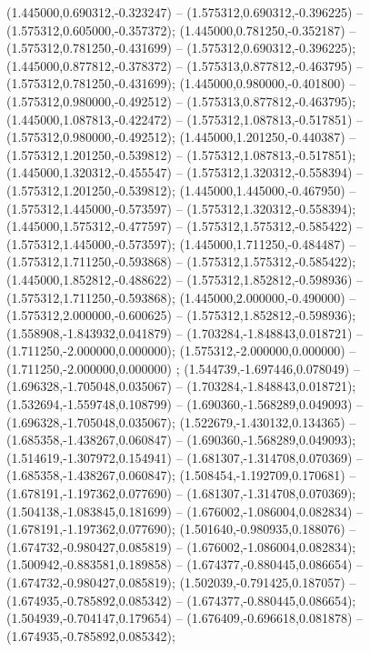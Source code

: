  (1.445000,0.690312,-0.323247) -- (1.575312,0.690312,-0.396225) -- (1.575312,0.605000,-0.357372);
 (1.445000,0.781250,-0.352187) -- (1.575312,0.781250,-0.431699) -- (1.575312,0.690312,-0.396225);
 (1.445000,0.877812,-0.378372) -- (1.575313,0.877812,-0.463795) -- (1.575312,0.781250,-0.431699);
 (1.445000,0.980000,-0.401800) -- (1.575312,0.980000,-0.492512) -- (1.575313,0.877812,-0.463795);
 (1.445000,1.087813,-0.422472) -- (1.575312,1.087813,-0.517851) -- (1.575312,0.980000,-0.492512);
 (1.445000,1.201250,-0.440387) -- (1.575312,1.201250,-0.539812) -- (1.575312,1.087813,-0.517851);
 (1.445000,1.320312,-0.455547) -- (1.575312,1.320312,-0.558394) -- (1.575312,1.201250,-0.539812);
 (1.445000,1.445000,-0.467950) -- (1.575312,1.445000,-0.573597) -- (1.575312,1.320312,-0.558394);
 (1.445000,1.575312,-0.477597) -- (1.575312,1.575312,-0.585422) -- (1.575312,1.445000,-0.573597);
 (1.445000,1.711250,-0.484487) -- (1.575312,1.711250,-0.593868) -- (1.575312,1.575312,-0.585422);
 (1.445000,1.852812,-0.488622) -- (1.575312,1.852812,-0.598936) -- (1.575312,1.711250,-0.593868);
 (1.445000,2.000000,-0.490000) -- (1.575312,2.000000,-0.600625) -- (1.575312,1.852812,-0.598936);
 (1.558908,-1.843932,0.041879) -- (1.703284,-1.848843,0.018721) -- (1.711250,-2.000000,0.000000);
 (1.575312,-2.000000,0.000000) -- (1.711250,-2.000000,0.000000) ;
 (1.544739,-1.697446,0.078049) -- (1.696328,-1.705048,0.035067) -- (1.703284,-1.848843,0.018721);
 (1.532694,-1.559748,0.108799) -- (1.690360,-1.568289,0.049093) -- (1.696328,-1.705048,0.035067);
 (1.522679,-1.430132,0.134365) -- (1.685358,-1.438267,0.060847) -- (1.690360,-1.568289,0.049093);
 (1.514619,-1.307972,0.154941) -- (1.681307,-1.314708,0.070369) -- (1.685358,-1.438267,0.060847);
 (1.508454,-1.192709,0.170681) -- (1.678191,-1.197362,0.077690) -- (1.681307,-1.314708,0.070369);
 (1.504138,-1.083845,0.181699) -- (1.676002,-1.086004,0.082834) -- (1.678191,-1.197362,0.077690);
 (1.501640,-0.980935,0.188076) -- (1.674732,-0.980427,0.085819) -- (1.676002,-1.086004,0.082834);
 (1.500942,-0.883581,0.189858) -- (1.674377,-0.880445,0.086654) -- (1.674732,-0.980427,0.085819);
 (1.502039,-0.791425,0.187057) -- (1.674935,-0.785892,0.085342) -- (1.674377,-0.880445,0.086654);
 (1.504939,-0.704147,0.179654) -- (1.676409,-0.696618,0.081878) -- (1.674935,-0.785892,0.085342);
